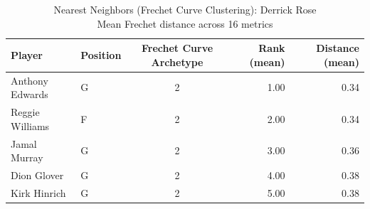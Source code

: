 \begin{table}[t]
\caption*{
{\fontsize{20}{25} Nearest Neighbors (Frechet Curve Clustering): Derrick Rose\fontsize{12}{15}\selectfont } \\ 
{\fontsize{14}{17}\selectfont  Mean Frechet distance across 16 metrics\fontsize{12}{15}\selectfont }
} 
\fontsize{12.0pt}{14.0pt}\selectfont
\begin{tabular*}{\linewidth}{@{\extracolsep{\fill}}llcrr}
\toprule
Player & Position & Frechet Curve Archetype & Rank (mean) & Distance (mean) \\ 
\midrule\addlinespace[2.5pt]
Anthony Edwards & G & 2 & 1.00 & 0.34 \\ 
Reggie Williams & F & 2 & 2.00 & 0.34 \\ 
Jamal Murray & G & 2 & 3.00 & 0.36 \\ 
Dion Glover & G & 2 & 4.00 & 0.38 \\ 
Kirk Hinrich & G & 2 & 5.00 & 0.38 \\ 
\bottomrule
\end{tabular*}
\end{table}

